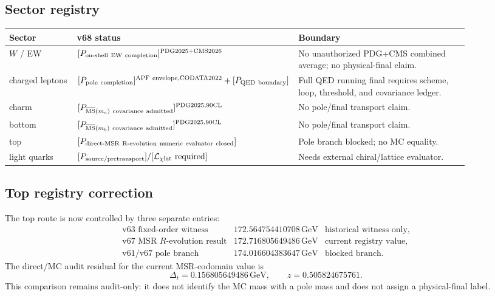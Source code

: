 \subsection{Sector registry}
\begin{center}
\begin{tabular}{p{0.15\linewidth} p{0.35\linewidth} p{0.38\linewidth}}
\hline
Sector & v68 status & Boundary \\
\hline
$W$ / EW & $[P_{\rm on\text{-}shell\ EW\ completion}]^{\rm PDG2025+CMS2026}$ & No unauthorized PDG+CMS combined average; no physical-final claim. \\
charged leptons & $[P_{\rm pole\ completion}]^{\rm APF\ envelope,CODATA2022}+[P_{\rm QED\ boundary}]$ & Full QED running final requires scheme, loop, threshold, and covariance ledger. \\
charm & $[P_{\overline{\rm MS}(m_c)\ \rm covariance\ admitted}]^{\rm PDG2025,90CL}$ & No pole/final transport claim. \\
bottom & $[P_{\overline{\rm MS}(m_b)\ \rm covariance\ admitted}]^{\rm PDG2025,90CL}$ & No pole/final transport claim. \\
top & $[P_{\rm direct\text{-}MSR\ R\text{-}evolution\ numeric\ evaluator\ closed}]$ & Pole branch blocked; no MC equality. \\
light quarks & $[P_{\rm source/pretransport}]/[\mathcal L_{\chi\mathrm{lat}}\ \rm required]$ & Needs external chiral/lattice evaluator. \\
\hline
\end{tabular}
\end{center}

\subsection{Top registry correction}
The top route is now controlled by three separate entries:
\[
\begin{array}{lll}
\text{v63 fixed-order witness} & 172.564754410708\,\mathrm{GeV} & \text{historical witness only},\\
\text{v67 MSR $R$-evolution result} & 172.716805649486\,\mathrm{GeV} & \text{current registry value},\\
\text{v61/v67 pole branch} & 174.016604383647\,\mathrm{GeV} & \text{blocked branch}.
\end{array}
\]
The direct/MC audit residual for the current MSR-codomain value is
\[
  \Delta_t=0.156805649486\,\mathrm{GeV},
  \qquad z=0.505824675761.
\]
This comparison remains audit-only: it does not identify the MC mass with a pole mass and does not assign a physical-final label.

